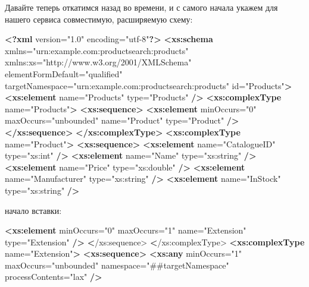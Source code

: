\documentclass[11pt]{article}
\newenvironment{Shaded}{}{}
\newcommand{\KeywordTok}[1]{\textcolor[rgb]{0.00,0.44,0.13}{\textbf{{#1}}}}
\newcommand{\StringTok}[1]{\textcolor[rgb]{0.25,0.44,0.63}{{#1}}}
\newcommand{\OtherTok}[1]{\textcolor[rgb]{0.00,0.44,0.13}{{#1}}}
\newcommand{\ErrorTok}[1]{\textcolor[rgb]{1.00,0.00,0.00}{\textbf{{#1}}}}
\newcommand{\NormalTok}[1]{{#1}}
\begin{document}
Давайте теперь откатимся назад во времени, и с самого начала укажем для
нашего сервиса совместимую, расширяемую схему:

\begin{Shaded}
\begin{Highlighting}[]
\KeywordTok{<?xml}\NormalTok{ version="1.0" encoding="utf-8"}\KeywordTok{?>}
\KeywordTok{<xs:schema}\OtherTok{ xmlns=}\StringTok{"urn:example.com:productsearch:products"} 
\OtherTok{  xmlns:xs=}\StringTok{"http://www.w3.org/2001/XMLSchema"}
\OtherTok{  elementFormDefault=}\StringTok{"qualified"} 
\OtherTok{  targetNamespace=}\StringTok{"urn:example.com:productsearch:products"} 
\OtherTok{  id=}\StringTok{"Products"}\KeywordTok{>}
  \KeywordTok{<xs:element}\OtherTok{ name=}\StringTok{"Products"}\OtherTok{ type=}\StringTok{"Products"} \KeywordTok{/>}
  \KeywordTok{<xs:complexType}\OtherTok{ name=}\StringTok{"Products"}\KeywordTok{>}
    \KeywordTok{<xs:sequence>}
      \KeywordTok{<xs:element}\OtherTok{ minOccurs=}\StringTok{"0"}\OtherTok{ maxOccurs=}\StringTok{"unbounded"}\OtherTok{ name=}\StringTok{"Product"}\OtherTok{ type=}\StringTok{"Product"} \KeywordTok{/>}
    \KeywordTok{</xs:sequence>}
  \KeywordTok{</xs:complexType>}
  \KeywordTok{<xs:complexType}\OtherTok{ name=}\StringTok{"Product"}\KeywordTok{>}
    \KeywordTok{<xs:sequence>}
      \KeywordTok{<xs:element}\OtherTok{ name=}\StringTok{"CatalogueID"}\OtherTok{ type=}\StringTok{"xs:int"} \KeywordTok{/>}
      \KeywordTok{<xs:element}\OtherTok{ name=}\StringTok{"Name"}\OtherTok{ type=}\StringTok{"xs:string"} \KeywordTok{/>}
      \KeywordTok{<xs:element}\OtherTok{ name=}\StringTok{"Price"}\OtherTok{ type=}\StringTok{"xs:double"} \KeywordTok{/>}
      \KeywordTok{<xs:element}\OtherTok{ name=}\StringTok{"Manufacturer"}\OtherTok{ type=}\StringTok{"xs:string"} \KeywordTok{/>}
      \KeywordTok{<xs:element}\OtherTok{ name=}\StringTok{"InStock"}\OtherTok{ type=}\StringTok{"xs:string"} \KeywordTok{/>}
\end{Highlighting}
\end{Shaded}

начало вставки:

\begin{Shaded}
\begin{Highlighting}[]
      \KeywordTok{<xs:element}\OtherTok{ minOccurs=}\StringTok{"0"}\OtherTok{ maxOccurs=}\StringTok{"1"}\OtherTok{ name=}\StringTok{"Extension"}\OtherTok{ type=}\StringTok{"Extension"} \KeywordTok{/>}
    \ErrorTok{<}\NormalTok{/xs:sequence>}
  \ErrorTok{<}\NormalTok{/xs:complexType>}
  \KeywordTok{<xs:complexType}\OtherTok{ name=}\StringTok{"Extension"}\KeywordTok{>}
    \KeywordTok{<xs:sequence>}
      \KeywordTok{<xs:any}\OtherTok{ minOccurs=}\StringTok{"1"}\OtherTok{ maxOccurs=}\StringTok{"unbounded"}\OtherTok{ namespace=}\StringTok{"##targetNamespace"}\OtherTok{ processContents=}\StringTok{"lax"} \KeywordTok{/>}
\end{Highlighting}
\end{Shaded}
\end{document}
